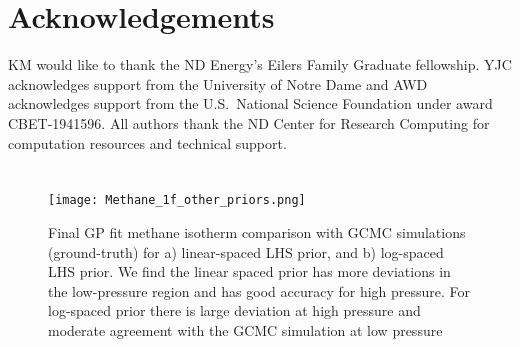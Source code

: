 \documentclass[twoside,twocolumn,9pt]{article}
\renewcommand{\refname}{Notes and references}
\begin{document}
\section*{Acknowledgements}
KM would like to thank the ND Energy's Eilers Family Graduate fellowship. YJC acknowledges support from the University of Notre Dame and AWD acknowledges support from the U.S.~National Science Foundation under award CBET-1941596. All authors thank the ND Center for Research Computing for computation resources and technical support.


\balance



{}
\nopagebreak
\renewcommand*\rmdefault{bch}\normalfont\upshape
\rmfamily
\section*{}
\vspace{-5cm}
\nopagebreak
\begin{figure*}
\centering
  \texttt{[image: Methane\_1f\_other\_priors.png]}
  \caption{Final GP fit methane isotherm comparison with GCMC simulations (ground-truth) for a) linear-spaced LHS prior, and b) log-spaced LHS prior. We find the linear spaced prior has more deviations in the low-pressure region and has good accuracy for high pressure. For log-spaced prior there is large deviation at high pressure and moderate agreement with the GCMC simulation at low pressure}
  \label{fgr:methane_other_priors}
\end{figure*}
\end{document}
